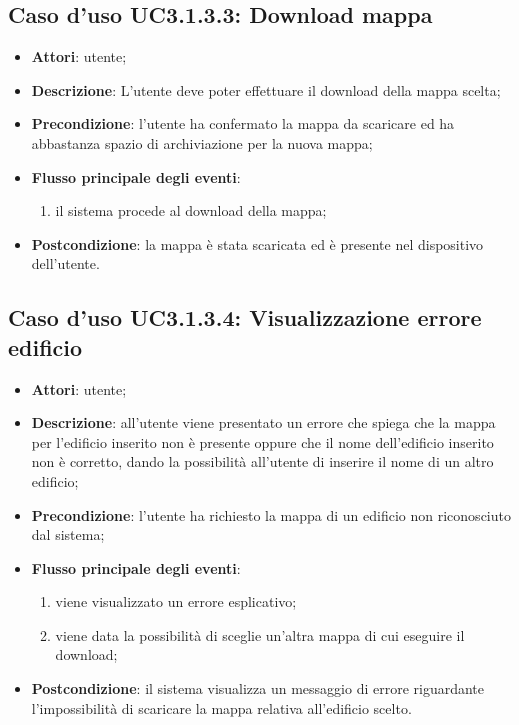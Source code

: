 \documentclass[../AnalisiDeiRequisiti.tex]{subfiles}
\begin{document}
\subsection{Caso d'uso UC3.1.3.3: Download mappa}
\begin{itemize}
\item \textbf{Attori}: utente;
\item \textbf{Descrizione}: L'utente deve poter effettuare il download della mappa scelta; 
      \item \textbf{Precondizione}: l'utente ha confermato la mappa da scaricare ed ha abbastanza spazio di archiviazione per la nuova mappa;

        \item \textbf{Flusso principale degli eventi}:
          \begin{enumerate}
          \item il sistema procede al download della mappa;

      \end{enumerate}
    \item \textbf{Postcondizione}: la mappa è stata scaricata ed è presente nel dispositivo dell'utente.
  \end{itemize}
\hypertarget{UC3.1.3.4}{}
\subsection{Caso d'uso UC3.1.3.4: Visualizzazione errore edificio}
\begin{itemize}
\item \textbf{Attori}: utente;
\item \textbf{Descrizione}: all'utente viene presentato un errore che spiega che la mappa per l'edificio inserito non è presente oppure che il nome dell'edificio inserito non è corretto, dando la possibilità all'utente di inserire il nome di un altro edificio; 
      \item \textbf{Precondizione}: l'utente ha richiesto la mappa di un edificio non riconosciuto dal sistema;

        \item \textbf{Flusso principale degli eventi}:
          \begin{enumerate}
          \item viene visualizzato un errore esplicativo;
          \item viene data la possibilità di sceglie un'altra mappa di cui eseguire il download;

      \end{enumerate}
    \item \textbf{Postcondizione}: il sistema visualizza un messaggio di errore riguardante l'impossibilità di scaricare la mappa relativa all'edificio scelto.
  \end{itemize}
\hypertarget{UC3.2}{}
\end{document}
